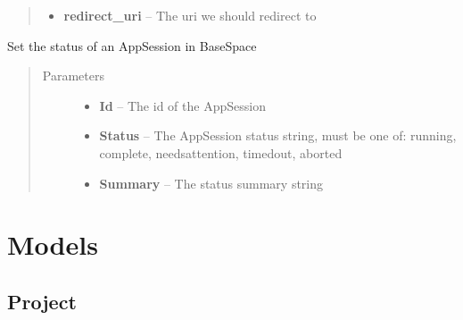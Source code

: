 \documentclass[letterpaper,10pt,english]{sphinxmanual}
\begin{document}
\begin{fulllineitems}
\begin{fulllineitems}
\begin{quote}
\begin{description}
\begin{itemize}
\item {} 
\textbf{redirect\_uri} -- The uri we should redirect to

\end{itemize}

\end{description}\end{quote}

\end{fulllineitems}


\begin{fulllineitems}
\label{Available modules:BaseSpacePy.api.BaseSpaceAPI.BaseSpaceAPI.setAppSessionState}
Set the status of an AppSession in BaseSpace
\begin{quote}\begin{description}
\item[{Parameters}] \leavevmode\begin{itemize}
\item {} 
\textbf{Id} -- The id of the AppSession

\item {} 
\textbf{Status} -- The AppSession status string, must be one of: running, complete, needsattention, timedout, aborted

\item {} 
\textbf{Summary} -- The status summary string

\end{itemize}

\end{description}\end{quote}

\end{fulllineitems}


\end{fulllineitems}



\section{Models}
\label{Available modules:models}

\subsection{Project}
\label{Available modules:project}
\end{document}

